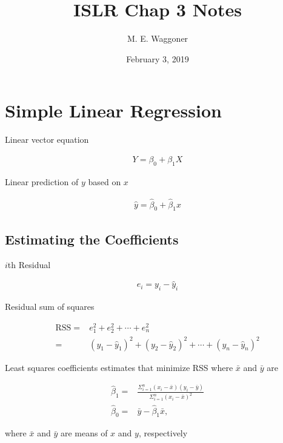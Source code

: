 \documentclass[]{article}
\title{ISLR Chap 3 Notes}
\author{M. E. Waggoner}
\date{February 3, 2019}
\newcommand{\rss}{\mathrm{RSS}}
\begin{document}
\maketitle

{
\setcounter{tocdepth}{2}
\tableofcontents
}
\section{Simple Linear Regression}\label{simple-linear-regression}

Linear vector equation

\begin{align}
Y = \beta_0 + \beta_1 X
\end{align}

Linear prediction of \(y\) based on \(x\)

\begin{align}
\hat{y} = \hat{\beta}_0 + \hat{\beta}_1 x
\end{align}

\subsection{Estimating the
Coefficients}\label{estimating-the-coefficients}

\(i\)th Residual

\begin{align*}
e_i = y_i - \hat{y}_i 
\end{align*}

Residual sum of squares

\begin{align}
    \rss =& e_1^2   + e_2^2 + \cdots + e_n^2 \nonumber \\ 
    =& \left( y_1 - \hat{y}_1\right)^2 + \left( y_2 - \hat{y}_2\right)^2 + \cdots + \left( y_n - \hat{y}_n\right)^2 
\end{align}

Least squares coefficients estimates that minimize RSS where \(\bar{x}\)
and \(\bar{y}\) are

\begin{align}
\hat{\beta}_1 =& \frac{\Sigma_{i = 1}^{n} \left(x_i - \bar{x}\right)\left(y_i - \bar{y}\right)}
                    {\Sigma_{i = 1}^{n} \left(x_i - \bar{x}\right)^2} \nonumber \\
\hat{\beta}_0   =& \bar{y} - \hat{\beta}_1 \bar{x},
\end{align}

where \(\bar{x}\) and \(\bar{y}\) are means of \(x\) and \(y\),
respectively
\end{document}
